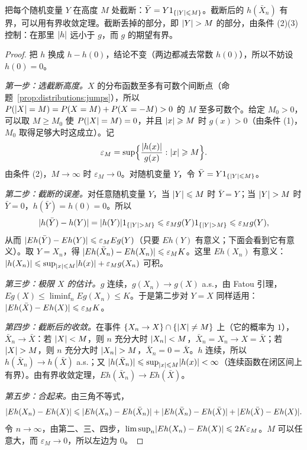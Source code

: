 \begin{remark}[证明思路]
把每个随机变量 $Y$ 在高度 $M$ 处截断：$\bar Y=Y1_{\{\lvert Y\rvert\leqslant M\}}$。截断后的 $h(\bar X_n)$ 有界，可以用有界收敛定理。截断丢掉的部分，即 $\lvert Y\rvert>M$ 的部分，由条件 (2)(3) 控制：在那里 $\lvert h\rvert$ 远小于 $g$，而 $g$ 的期望有界。
\end{remark}

\begin{proof}
把 $h$ 换成 $h-h(0)$，结论不变（两边都减去常数 $h(0)$），所以不妨设 $h(0)=0$。

\emph{第一步：选截断高度。}$X$ 的分布函数至多有可数个间断点（命题~\ref{prop:distributions:jumps}），所以 $P(\lvert X\rvert=M)=P(X=M)+P(X=-M)>0$ 的 $M$ 至多可数个。给定 $M_0>0$，可以取 $M\geqslant M_0$ 使 $P(\lvert X\rvert=M)=0$，并且 $\lvert x\rvert\geqslant M$ 时 $g(x)>0$（由条件 (1)，$M_0$ 取得足够大时这成立）。记
\[
\varepsilon_M=\sup\Bigl\{\frac{\lvert h(x)\rvert}{g(x)}:\lvert x\rvert\geqslant M\Bigr\}.
\]
由条件 (2)，$M\to\infty$ 时 $\varepsilon_M\to0$。对随机变量 $Y$，令 $\bar Y=Y1_{\{\lvert Y\rvert\leqslant M\}}$。

\emph{第二步：截断的误差。}对任意随机变量 $Y$，当 $\lvert Y\rvert\leqslant M$ 时 $\bar Y=Y$；当 $\lvert Y\rvert>M$ 时 $\bar Y=0$，$h(\bar Y)=h(0)=0$。所以
\[
\lvert h(\bar Y)-h(Y)\rvert=\lvert h(Y)\rvert1_{\{\lvert Y\rvert>M\}}\leqslant\varepsilon_Mg(Y)1_{\{\lvert Y\rvert>M\}}\leqslant\varepsilon_Mg(Y),
\]
从而 $\lvert Eh(\bar Y)-Eh(Y)\rvert\leqslant\varepsilon_MEg(Y)$（只要 $Eh(Y)$ 有意义；下面会看到它有意义）。取 $Y=X_n$，得 $\lvert Eh(\bar X_n)-Eh(X_n)\rvert\leqslant\varepsilon_MK$。这里 $Eh(X_n)$ 有意义：$\lvert h(X_n)\rvert\leqslant\sup_{\lvert x\rvert\leqslant M}\lvert h(x)\rvert+\varepsilon_Mg(X_n)$ 可积。

\emph{第三步：极限 $X$ 的估计。}$g$ 连续，$g(X_n)\to g(X)$ a.s.，由 Fatou 引理，$Eg(X)\leqslant\liminf_nEg(X_n)\leqslant K$。于是第二步对 $Y=X$ 同样适用：$\lvert Eh(\bar X)-Eh(X)\rvert\leqslant\varepsilon_MK$。

\emph{第四步：截断后的收敛。}在事件 $\{X_n\to X\}\cap\{\lvert X\rvert\neq M\}$ 上（它的概率为 $1$），$\bar X_n\to\bar X$：若 $\lvert X\rvert<M$，则 $n$ 充分大时 $\lvert X_n\rvert<M$，$\bar X_n=X_n\to X=\bar X$；若 $\lvert X\rvert>M$，则 $n$ 充分大时 $\lvert X_n\rvert>M$，$\bar X_n=0=\bar X$。$h$ 连续，所以 $h(\bar X_n)\to h(\bar X)$ a.s.；又 $\lvert h(\bar X_n)\rvert\leqslant\sup_{\lvert x\rvert\leqslant M}\lvert h(x)\rvert<\infty$（连续函数在闭区间上有界）。由有界收敛定理，$Eh(\bar X_n)\to Eh(\bar X)$。

\emph{第五步：合起来。}由三角不等式，
\[
\lvert Eh(X_n)-Eh(X)\rvert\leqslant\lvert Eh(X_n)-Eh(\bar X_n)\rvert+\lvert Eh(\bar X_n)-Eh(\bar X)\rvert+\lvert Eh(\bar X)-Eh(X)\rvert .
\]
令 $n\to\infty$，由第二、三、四步，$\limsup_n\lvert Eh(X_n)-Eh(X)\rvert\leqslant2K\varepsilon_M$。$M$ 可以任意大，而 $\varepsilon_M\to0$，所以左边为 $0$。
\end{proof}

